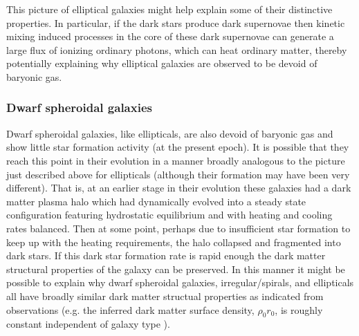 \documentclass[12pt]{article}
\begin{document}
{{This picture of elliptical galaxies might help explain some of their
distinctive properties. In particular, if the dark stars produce dark
supernovae then kinetic mixing induced processes in the core of these
dark supernovae can generate a large flux of ionizing ordinary photons,
which can heat ordinary matter, thereby potentially explaining why
elliptical galaxies are observed to be devoid of baryonic gas.

\subsubsection{Dwarf spheroidal galaxies}

Dwarf spheroidal galaxies, like ellipticals, are also devoid of baryonic
gas and show little star formation activity (at the present epoch).
It is possible that they reach this point in their evolution in a manner
broadly analogous to the picture just described above for ellipticals
(although their formation may have been very different).
That is, at an earlier stage in their evolution 
these galaxies had a dark matter plasma halo which had dynamically
evolved into a steady state configuration
featuring hydrostatic equilibrium and with heating and cooling rates
balanced.
Then at some point, perhaps due to insufficient star formation to keep
up with the heating 
requirements, the halo collapsed and fragmented into
dark stars. If this dark star formation rate is rapid enough the dark
matter structural properties of the galaxy can be preserved.
In this manner it might be possible to explain why dwarf spheroidal
galaxies, irregular/spirals, and ellipticals all have 
broadly similar dark matter structual properties as indicated from
observations 
(e.g. the inferred dark matter surface density, $\rho_0 r_0$, is roughly
constant independent of galaxy type \cite{donato2}).

}}
\end{document}
